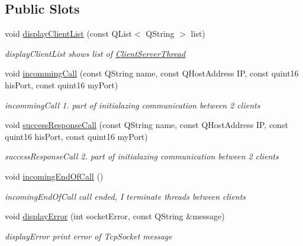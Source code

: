 \subsection*{Public Slots}
\begin{DoxyCompactItemize}
\item 
void \hyperlink{classPenguinClient_1_1ClientBackgroundManager_a20188400ab079c3e9007f0fa8eb3eb72}{display\-Client\-List} (const Q\-List$<$ Q\-String $>$ list)
\begin{DoxyCompactList}\small\item\em display\-Client\-List shows list of \hyperlink{classPenguinClient_1_1ClientServerThread}{Client\-Server\-Thread} \end{DoxyCompactList}\item 
void \hyperlink{classPenguinClient_1_1ClientBackgroundManager_a906fafa8aa934bd6b42eb6389cb1b13c}{incomming\-Call} (const Q\-String name, const Q\-Host\-Address I\-P, const quint16 his\-Port, const quint16 my\-Port)
\begin{DoxyCompactList}\small\item\em incomming\-Call 1. part of initialazing communication between 2 clients \end{DoxyCompactList}\item 
void \hyperlink{classPenguinClient_1_1ClientBackgroundManager_a5e403150552041e610e59c8a21f436cc}{success\-Response\-Call} (const Q\-String name, const Q\-Host\-Address I\-P, const quint16 his\-Port, const quint16 my\-Port)
\begin{DoxyCompactList}\small\item\em success\-Response\-Call 2. part of initialazing communication between 2 clients \end{DoxyCompactList}\item 
\hypertarget{classPenguinClient_1_1ClientBackgroundManager_a14b9cf4e8330646b04d9cc20c3c8266b}{void \hyperlink{classPenguinClient_1_1ClientBackgroundManager_a14b9cf4e8330646b04d9cc20c3c8266b}{incoming\-End\-Of\-Call} ()}\label{classPenguinClient_1_1ClientBackgroundManager_a14b9cf4e8330646b04d9cc20c3c8266b}

\begin{DoxyCompactList}\small\item\em incoming\-End\-Of\-Call call ended, I terminate threads between clients \end{DoxyCompactList}\item 
void \hyperlink{classPenguinClient_1_1ClientBackgroundManager_a60a97bd6e105887a188ca99d69996e48}{display\-Error} (int socket\-Error, const Q\-String \&message)
\begin{DoxyCompactList}\small\item\em display\-Error print error of Tcp\-Socket message \end{DoxyCompactList}\end{DoxyCompactItemize}
